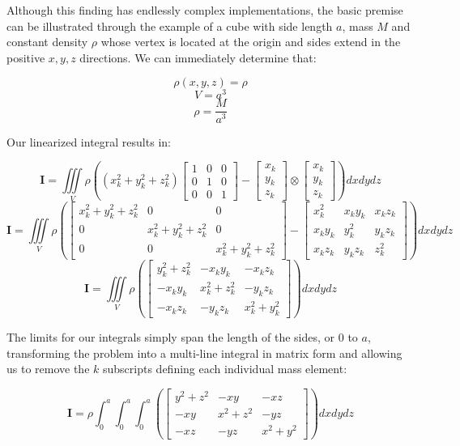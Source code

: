 Although this finding has endlessly complex implementations, the basic premise can be illustrated through the example of a cube with side length $a$, mass $M$ and constant density $\rho$ whose vertex is located at the origin and sides extend in the positive $x, y, z$ directions. We can immediately determine that:

\[\rho(x,y,z) = \rho\]
\[V = a^3\]
\[\rho = \frac{M}{a^3}\]

Our linearized integral results in:

\[\bm{I} = \iiint\limits_{V} \rho\left((x_k^2 + y_k^2 + z_k^2)\begin{bmatrix}1 & 0 & 0 \\ 0 & 1 & 0 \\ 0 & 0 & 1\end{bmatrix} - \begin{bmatrix}x_k \\ y_k \\ z_k\end{bmatrix} \otimes \begin{bmatrix}x_k \\ y_k \\ z_k\end{bmatrix}\right)dxdydz\]
\[\bm{I} = \iiint\limits_{V} \rho\left(\begin{bmatrix}x_k^2 + y_k^2 + z_k^2 & 0 & 0 \\ 0 & x_k^2 + y_k^2 + z_k^2 & 0 \\ 0 & 0 & x_k^2 + y_k^2 + z_k^2\end{bmatrix} - \begin{bmatrix}x_k^2 & x_ky_k & x_kz_k \\ x_ky_k & y_k^2 & y_kz_k \\ x_kz_k & y_kz_k & z_k^2 \end{bmatrix}\right)dxdydz\]
\[\bm{I} = \iiint\limits_{V} \rho\left(\begin{bmatrix}y_k^2 + z_k^2 & -x_ky_k & -x_kz_k \\ -x_ky_k & x_k^2 + z_k^2 & -y_kz_k \\ -x_kz_k & -y_kz_k & x_k^2 + y_k^2 \end{bmatrix}\right)dxdydz\]

The limits for our integrals simply span the length of the sides, or $0$ to $a$, transforming the problem into a multi-line integral in matrix form and allowing us to remove the $k$ subscripts defining each individual mass element:

\[\bm{I} = \rho\int_0^a \int_0^a \int_0^a  \left(\begin{bmatrix}y^2 + z^2 & -xy & -xz \\ -xy & x^2 + z^2 & -yz \\ -xz & -yz & x^2 + y^2 \end{bmatrix}\right)dxdydz\]

